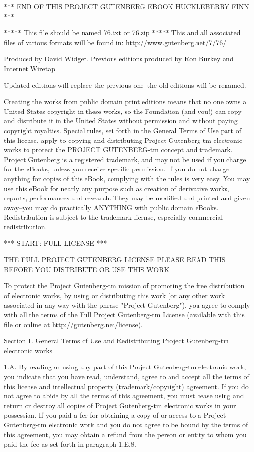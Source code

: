 *** END OF THIS PROJECT GUTENBERG EBOOK HUCKLEBERRY FINN ***

***** This file should be named 76.txt or 76.zip *****
This and all associated files of various formats will be found in:
        http://www.gutenberg.net/7/76/

Produced by David Widger. Previous editions produced by Ron Burkey
and Internet Wiretap


Updated editions will replace the previous one--the old editions
will be renamed.

Creating the works from public domain print editions means that no
one owns a United States copyright in these works, so the Foundation
(and you!) can copy and distribute it in the United States without
permission and without paying copyright royalties.  Special rules,
set forth in the General Terms of Use part of this license, apply to
copying and distributing Project Gutenberg-tm electronic works to
protect the PROJECT GUTENBERG-tm concept and trademark.  Project
Gutenberg is a registered trademark, and may not be used if you
charge for the eBooks, unless you receive specific permission.  If you
do not charge anything for copies of this eBook, complying with the
rules is very easy.  You may use this eBook for nearly any purpose
such as creation of derivative works, reports, performances and
research.  They may be modified and printed and given away--you may do
practically ANYTHING with public domain eBooks.  Redistribution is
subject to the trademark license, especially commercial
redistribution.



*** START: FULL LICENSE ***

THE FULL PROJECT GUTENBERG LICENSE
PLEASE READ THIS BEFORE YOU DISTRIBUTE OR USE THIS WORK

To protect the Project Gutenberg-tm mission of promoting the free
distribution of electronic works, by using or distributing this work
(or any other work associated in any way with the phrase "Project
Gutenberg"), you agree to comply with all the terms of the Full Project
Gutenberg-tm License (available with this file or online at
http://gutenberg.net/license).


Section 1.  General Terms of Use and Redistributing Project Gutenberg-tm
electronic works

1.A.  By reading or using any part of this Project Gutenberg-tm
electronic work, you indicate that you have read, understand, agree to
and accept all the terms of this license and intellectual property
(trademark/copyright) agreement.  If you do not agree to abide by all
the terms of this agreement, you must cease using and return or destroy
all copies of Project Gutenberg-tm electronic works in your possession.
If you paid a fee for obtaining a copy of or access to a Project
Gutenberg-tm electronic work and you do not agree to be bound by the
terms of this agreement, you may obtain a refund from the person or
entity to whom you paid the fee as set forth in paragraph 1.E.8.

